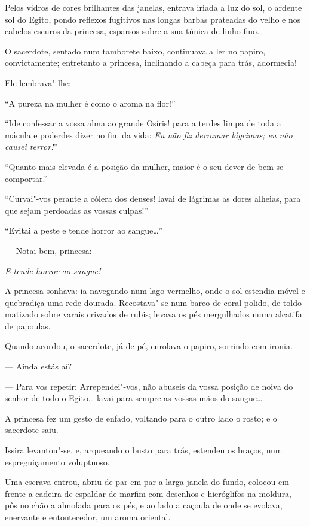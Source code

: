 Pelos vidros de cores brilhantes das janelas, entrava iriada a luz do
sol, o ardente sol do Egito, pondo reflexos fugitivos nas longas barbas
prateadas do velho e nos cabelos escuros da princesa, esparsos sobre a
sua túnica de linho fino.

O sacerdote, sentado num tamborete baixo, continuava a ler no papiro,
convictamente; entretanto a princesa, inclinando a cabeça para trás,
adormecia!

Ele lembrava"-lhe:

``A pureza na mulher é como o aroma na flor!''

``Ide confessar a vossa alma ao grande Osíris! para a terdes limpa de
toda a mácula e poderdes dizer no fim da vida: \emph{Eu não fiz derramar
lágrimas; eu não causei terror!}''

``Quanto mais elevada é a posição da mulher, maior é o seu dever de bem
se comportar.''

``Curvai"-vos perante a cólera dos deuses! lavai de lágrimas as dores
alheias, para que sejam perdoadas as vossas culpas!''

``Evitai a peste e tende horror ao sangue\ldots{}''

--- Notai bem, princesa:

\emph{E tende horror ao sangue!}

A princesa sonhava: ia navegando num lago vermelho, onde o sol estendia
móvel e quebradiça uma rede dourada. Recostava"-se num barco de coral
polido, de toldo matizado sobre varais crivados de rubis; levava os pés
mergulhados numa alcatifa de papoulas.

Quando acordou, o sacerdote, já de pé, enrolava o papiro, sorrindo com
ironia.

--- Ainda estás aí?

--- Para vos repetir: Arrependei"-vos, não abuseis da vossa posição de
noiva do senhor de todo o Egito\ldots{} lavai para sempre as vossas mãos do
sangue\ldots{}

A princesa fez um gesto de enfado, voltando para o outro lado o rosto; e
o sacerdote saiu.

Issira levantou"-se, e, arqueando o busto para trás, estendeu os braços,
num espreguiçamento voluptuoso.

Uma escrava entrou, abriu de par em par a larga janela do fundo, colocou
em frente a cadeira de espaldar de marfim com desenhos e hieróglifos na
moldura, pôs no chão a almofada para os pés, e ao lado a caçoula de onde
se evolava, enervante e entontecedor, um aroma oriental.

